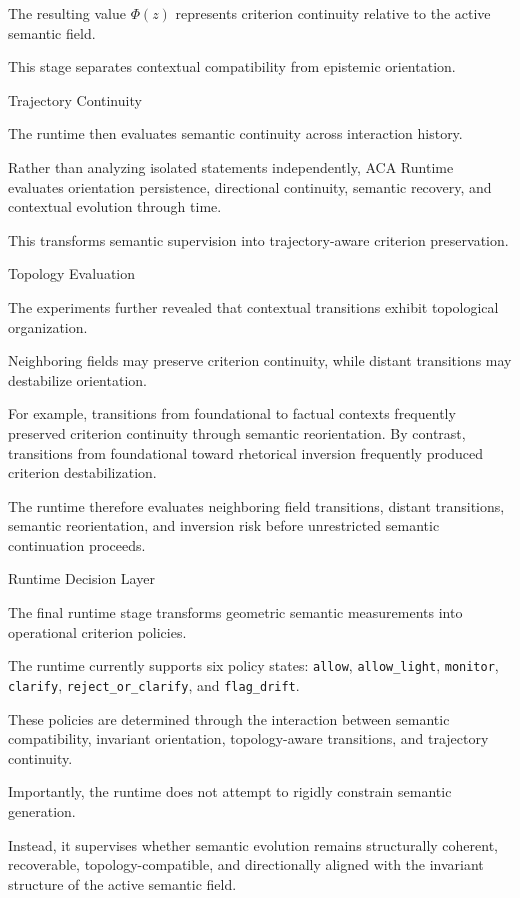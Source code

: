 \documentclass[11pt]{article}
\begin{document}
The resulting value $\Phi(z)$ represents criterion continuity relative to the active semantic field.

This stage separates contextual compatibility from epistemic orientation.

Trajectory Continuity

The runtime then evaluates semantic continuity across interaction history.

Rather than analyzing isolated statements independently, ACA Runtime evaluates orientation persistence, directional continuity, semantic recovery, and contextual evolution through time.

This transforms semantic supervision into trajectory-aware criterion preservation.

Topology Evaluation

The experiments further revealed that contextual transitions exhibit topological organization.

Neighboring fields may preserve criterion continuity, while distant transitions may destabilize orientation.

For example, transitions from foundational to factual contexts frequently preserved criterion continuity through semantic reorientation. By contrast, transitions from foundational toward rhetorical inversion frequently produced criterion destabilization.

The runtime therefore evaluates neighboring field transitions, distant transitions, semantic reorientation, and inversion risk before unrestricted semantic continuation proceeds.

Runtime Decision Layer

The final runtime stage transforms geometric semantic measurements into operational criterion policies.

The runtime currently supports six policy states: \texttt{allow}, \texttt{allow\_light}, \texttt{monitor}, \texttt{clarify}, \texttt{reject\_or\_clarify}, and \texttt{flag\_drift}.

These policies are determined through the interaction between semantic compatibility, invariant orientation, topology-aware transitions, and trajectory continuity.

Importantly, the runtime does not attempt to rigidly constrain semantic generation.

Instead, it supervises whether semantic evolution remains structurally coherent, recoverable, topology-compatible, and directionally aligned with the invariant structure of the active semantic field.
\end{document}
